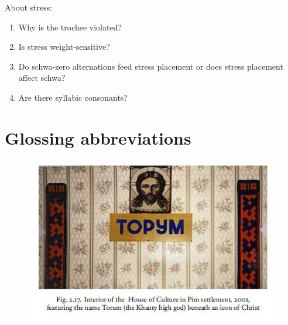 \documentclass[a4paper, 12pt]{article}
\begin{document}
	\noindent About stress:
	
\begin{enumerate}[$\gg$]
	\item Why is the trochee violated?
	\item Is stress weight-sensitive?
	\item Do schwa-zero alternations feed stress placement or does stress placement affect schwa?
	\item Are there syllabic consonants?
\end{enumerate}

	\section*{Glossing abbreviations}
	
\printglossaries
	
\printbibliography

	\begin{figure}[H]
		\centering
		\includegraphics[scale=.66]{end}
	\end{figure}
\end{document}
